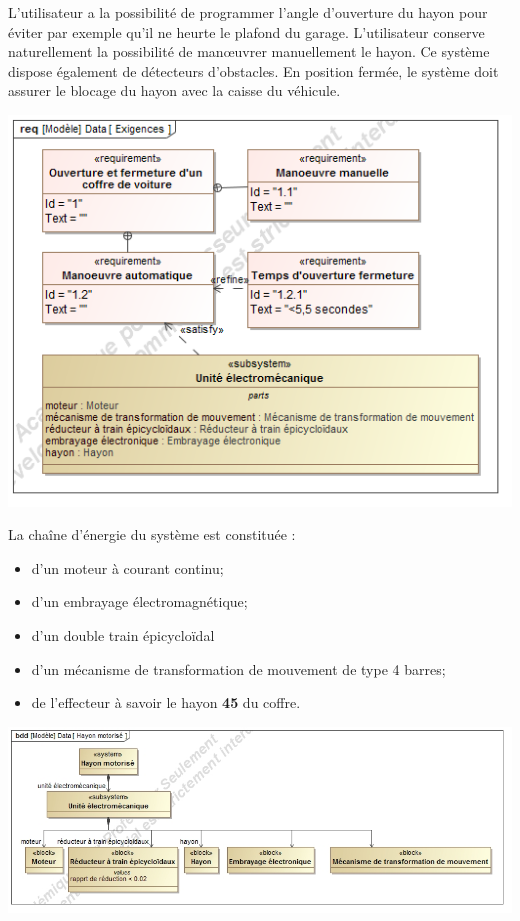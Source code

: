 \documentclass[10pt,fleqn]{article} %
\begin{document}
\begin{multicols}{2}
L’utilisateur a la possibilité de programmer l’angle d’ouverture du hayon pour
éviter par exemple qu’il ne heurte le plafond du garage. L’utilisateur conserve
naturellement la possibilité de man\oe{}uvrer manuellement le hayon. Ce système
dispose également de détecteurs d’obstacles.
En position fermée, le système doit assurer le blocage du hayon avec la caisse
du véhicule.
\begin{center}
\includegraphics[width=.95\linewidth]{images/SysML/Req}
\end{center}



La chaîne d'énergie du système est constituée :
\begin{itemize}
\item d'un moteur à courant continu;
\item d'un embrayage électromagnétique;
\item d'un double train épicycloïdal
\item d'un mécanisme de transformation de mouvement de type 4 barres;
\item de l'effecteur à savoir le hayon \textbf{45} du coffre.
\end{itemize}

\begin{center}
\includegraphics[width=.95\linewidth]{images/SysML/BDD}
\end{center}



\end{multicols}
\end{document}
